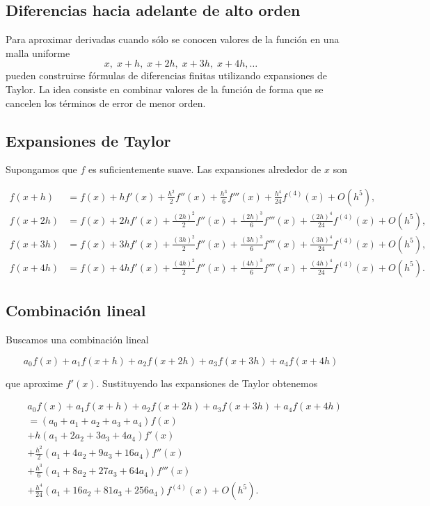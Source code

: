 \documentclass[12pt,a4paper]{article}
\theoremstyle{definition}
\theoremstyle{remark}
\begin{document}
\subsection{Diferencias hacia adelante de alto orden}

Para aproximar derivadas cuando sólo se conocen valores de la función en una malla uniforme
\[
x, \; x+h, \; x+2h, \; x+3h, \; x+4h, \dots
\]
pueden construirse fórmulas de diferencias finitas utilizando expansiones de Taylor.
La idea consiste en combinar valores de la función de forma que se cancelen los términos
de error de menor orden.

\subsection{Expansiones de Taylor}

Supongamos que $f$ es suficientemente suave. Las expansiones alrededor de $x$ son

\begin{align}
f(x+h) &= f(x) + hf'(x) + \frac{h^2}{2}f''(x) + \frac{h^3}{6}f'''(x)
+ \frac{h^4}{24}f^{(4)}(x) + O(h^5),\\
f(x+2h) &= f(x) + 2hf'(x) + \frac{(2h)^2}{2}f''(x) + \frac{(2h)^3}{6}f'''(x)
+ \frac{(2h)^4}{24}f^{(4)}(x) + O(h^5),\\
f(x+3h) &= f(x) + 3hf'(x) + \frac{(3h)^2}{2}f''(x) + \frac{(3h)^3}{6}f'''(x)
+ \frac{(3h)^4}{24}f^{(4)}(x) + O(h^5),\\
f(x+4h) &= f(x) + 4hf'(x) + \frac{(4h)^2}{2}f''(x) + \frac{(4h)^3}{6}f'''(x)
+ \frac{(4h)^4}{24}f^{(4)}(x) + O(h^5).
\end{align}

\subsection{Combinación lineal}

Buscamos una combinación lineal

\[
a_0 f(x) + a_1 f(x+h) + a_2 f(x+2h) + a_3 f(x+3h) + a_4 f(x+4h)
\]

que aproxime $f'(x)$. Sustituyendo las expansiones de Taylor obtenemos

\begin{align}
&a_0 f(x) + a_1 f(x+h) + a_2 f(x+2h) + a_3 f(x+3h) + a_4 f(x+4h) \\
&= (a_0+a_1+a_2+a_3+a_4)f(x) \\
&+ h(a_1+2a_2+3a_3+4a_4)f'(x) \\
&+ \frac{h^2}{2}(a_1+4a_2+9a_3+16a_4)f''(x) \\
&+ \frac{h^3}{6}(a_1+8a_2+27a_3+64a_4)f'''(x) \\
&+ \frac{h^4}{24}(a_1+16a_2+81a_3+256a_4)f^{(4)}(x) + O(h^5).
\end{align}
\end{document}
